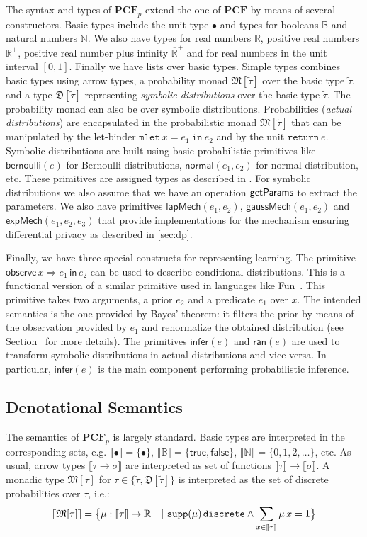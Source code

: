 \documentclass{sig-alternate-05-2015}
\theoremstyle{plain}
\theoremstyle{definition}
\theoremstyle{corollary}
\def\pcf{\ensuremath{\mathbf{PCF}}\xspace}
\def\pcfp{\ensuremath{\mathbf{PCF}_{p}}\xspace}
\newcommand{\coty}[1]{\widetilde{#1}}
\def\kwin{\mathtt{in}}
\def\kwunit{\mathtt{return}}
\def\kwbind{\mathtt{mlet}}
\newcommand{\sunitM}[1]{\kwunit\ {#1}}
\newcommand{\sbindM}[3]{\kwbind\ {#1} = {#2}\ \kwin\ {#3}}
\newcommand{\stmod}[1]{\mathfrak{M}[{#1}]}
\newcommand{\stunit}[0]{\bullet}
\newcommand{\stbool}[0]{\mathbb{B}}
\newcommand{\stnat}[0]{\mathbb{N}}
\newcommand{\tyinterp}[1]{\llbracket {#1} \rrbracket}
\def\R{\mathbb{R}}
\newcommand{\rplusinfty}{\ensuremath{\overline{\R}^+}}
\newcommand{\rplus}{\R^+}
\newcommand{\observe}[3]{\mathsf{observe}\, #1\Rightarrow #2\,
  \mathsf{in}\, #3}
\newcommand{\binfer}[1]{\mathsf{infer}(#1) }
\newcommand{\bran}[1]{\mathsf{ran}(#1) }
\newcommand{\bernoulli}[1]{\mathsf{bernoulli}(#1) }
\newcommand{\normal}[2]{\mathsf{normal}(#1,#2) }
\newcommand{\laplace}[2]{\mathsf{lapMech}(#1,#2) }
\newcommand{\gauss}[2]{\mathsf{gaussMech}(#1,#2) }
\newcommand{\stdist}[1]{\mathfrak{D}[{#1}]}
\newcommand{\exponential}[3]{\mathsf{expMech}(#1,#2,#3) }
\begin{document}
The syntax and types of \pcfp extend the one of \pcf by means of
several constructors. Basic types include the unit type $\stunit$ and
types for booleans $\stbool$ and natural numbers $\stnat$. We also
have types for real numbers $\R$, positive real numbers $\rplus$,
positive real number plus infinity $\rplusinfty$ and for real numbers
in the unit interval $[0,1]$. Finally we have lists over basic types. Simple types combines basic types using
arrow types, a probability monad $\stmod{\coty{\tau}}$ over the basic
type $\coty{\tau}$, and a type $\stdist{\coty{\tau}}$ representing
\emph{symbolic distributions} over the basic type $\coty{\tau}$.  The
probability monad can also be over symbolic distributions. 
Probabilities (\emph{actual distributions})
are encapsulated in the probabilistic monad $\stmod{\coty{\tau}}$ that can be manipulated by
the let-binder $\sbindM{x}{e_1}{e_2}$ and by the unit
$\sunitM{e}$. Symbolic distributions are built using basic probabilistic
primitives like $\bernoulli{e}$ for Bernoulli distributions,
$\normal{e_1}{e_2}$ for normal distribution, etc. These primitives are
assigned types as described in .  For 
symbolic distributions we also assume that we have an operation ${\sf getParams}$ to extract the
parameters. We also have primitives
$\laplace{e_1}{e_2}$, $\gauss{e_1}{e_2}$ and
$\exponential{e_1}{e_2}{e_3}$ that provide implementations for the
mechanism ensuring differential privacy as described in
\cref{sec:dp}.  

Finally, we have three special
constructs for representing learning. The primitive
$\observe{x}{e_1}{e_2}$ can be used to describe conditional
distributions. This is a functional version of a similar primitive
used in languages like Fun~\citep{GordonABCGNRR13}. This primitive
takes two arguments, a prior $e_2$ and a predicate $e_1$ over $x$. The
intended semantics is the one provided by Bayes' theorem: it filters
the prior by means of the observation provided by $e_1$ and renormalize the
obtained distribution (see
Section~ for more details). The primitives $\binfer{e}$ and
$\bran{e}$ are used to transform symbolic distributions in actual
distributions and vice versa. 
In particular, $\binfer{e}$ is the main
component performing probabilistic inference.




\subsection{Denotational Semantics}
\label{sec:denotSemantics}
The semantics of \pcfp is largely standard. Basic types are
interpreted in the corresponding sets,
e.g. $\tyinterp{\stunit}=\{\stunit\}$, $\tyinterp{\stbool}=\{\mathsf{true},\mathsf{false}\}$,
$\tyinterp{\stnat}=\{0,1,2,\ldots\}$, etc.
As usual, arrow types $\tyinterp{\tau\to \sigma}$ are
interpreted as set of functions
$\tyinterp{\tau}\to\tyinterp{\sigma}$. A  monadic type $\stmod{\tau}$
for $\tau\in \{\coty{\tau},\stdist{\coty{\tau}}\}$ is interpreted
as the set of discrete probabilities over $\tau$, i.e.:
$$
\tyinterp{\stmod{\tau}}=
\big\{\mu:\tyinterp{\tau}\to\rplus \ |\ {\tt supp}(\mu)\, {\tt discrete}\land
\sum_{x\in\tyinterp{\tau}}\mu\, x=1 \big \}
$$
\end{document}
